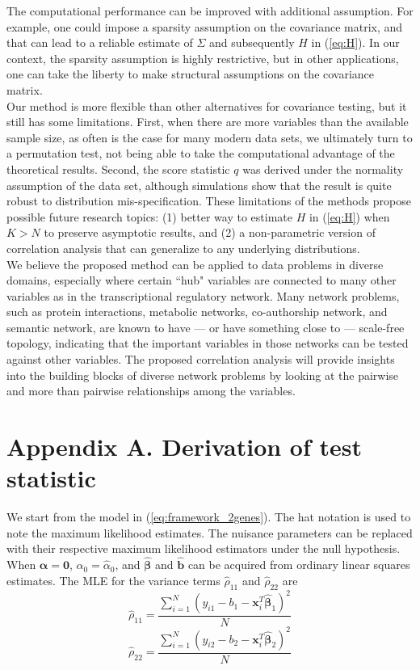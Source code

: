 \documentclass[aap,authoryear, preprint]{imsart}
\numberwithin{equation}{section}
\theoremstyle{plain}
\begin{document}
The computational performance can be improved with additional assumption. For example, one could impose a sparsity assumption on the covariance matrix, and that can lead to a reliable estimate of $\Sigma$ and subsequently $H$ in (\ref{eq:H}). In our context, the sparsity assumption is highly restrictive, but in other applications, one can take the liberty to make structural assumptions on the covariance matrix.  \\

Our method is more flexible than other alternatives for covariance testing, but it still has some limitations. First, when there are more variables than the available sample size, as often is the case for many modern data sets, we ultimately turn to a permutation test, not being able to take the computational advantage of the theoretical results. Second, the score statistic $q$ was derived under the normality assumption of the data set, although simulations show that the result is quite robust to distribution mis-specification. These limitations of the methods propose possible future research topics: (1) better way to estimate $H$ in (\ref{eq:H}) when $K > N$ to preserve asymptotic results, and (2) a non-parametric version of correlation analysis that can generalize to any underlying distributions. \\

We believe the proposed method can be applied to data problems in diverse domains, especially where certain ``hub" variables are connected to many other variables as in the transcriptional regulatory network. Many network problems, such as protein interactions, metabolic networks, co-authorship network, and semantic network, are known to have --- or have something close to --- scale-free topology, indicating that the important variables in those networks can be tested against other variables. The proposed correlation analysis will provide insights into the building blocks of diverse network problems by looking at the pairwise and more than pairwise relationships among the variables.



 
\pagebreak
 
\section*{Appendix A. Derivation of test statistic}
We start from the model in (\ref{eq:framework_2genes}). The hat notation is used to note the maximum likelihood estimates. The nuisance parameters can be replaced with their respective maximum likelihood estimators under the null hypothesis. When $\bm{\alpha} = \bm{0}$, $\alpha_0 = \hat{\alpha}_0$, and $\hat{\bm{\beta}}$ and $\hat{\bm{b}}$ can be acquired from ordinary linear squares estimates. The MLE for the variance terms $\hat{\rho}_{11}$ and $\hat{\rho}_{22}$ are
$$\hat{\rho}_{11} =  \frac{\sum_{i=1}^{N}(y_{i1} - b_1 - \bm{x}_i^T\bm{\hat{\beta}}_{1})^2}{N}$$
$$\hat{\rho}_{22}=  \frac{\sum_{i=1}^{N}(y_{i2} - b_2 - \bm{x}_i^T\bm{\hat{\beta}}_{2})^2}{N}$$
\end{document}
